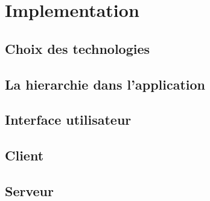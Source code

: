 \chapter{Implementation}
        \section{Choix des technologies}
        \lipsum[1]
        \section{La hierarchie dans l'application}
        \lipsum[1]
        \section{Interface utilisateur}
        \lipsum[1]
        \section{Client}
        \lipsum[1]
        \section{Serveur}
        \lipsum[1]